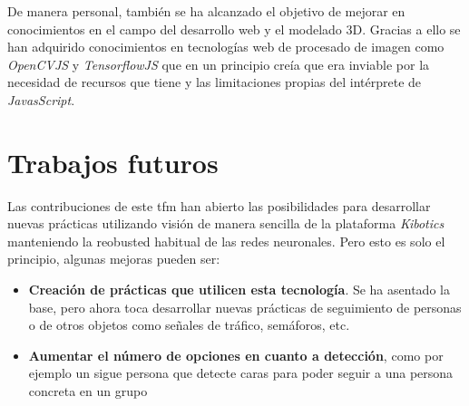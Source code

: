 De manera personal, también se ha alcanzado el objetivo de mejorar en conocimientos en el campo del desarrollo web y el modelado 3D. Gracias a ello se han adquirido conocimientos en tecnologías web de procesado de imagen como \textit{OpenCVJS} y \textit{TensorflowJS }que en un principio creía que era inviable por la necesidad de recursos que tiene y las limitaciones propias del intérprete de \textit{JavasScript}.
\section{Trabajos futuros}
Las contribuciones de este \acrshort{tfm} han abierto las posibilidades para desarrollar nuevas prácticas utilizando visión de manera sencilla de la plataforma \textit{Kibotics} manteniendo la reobusted habitual de las redes neuronales. Pero esto es solo el principio, algunas mejoras pueden ser:

\begin{itemize}
  \item \textbf{Creación de prácticas que utilicen esta tecnología}. Se ha asentado la base, pero ahora toca desarrollar nuevas prácticas de seguimiento de personas o de otros objetos como señales de tráfico, semáforos, etc.
  \item \textbf{Aumentar el número de opciones en cuanto a detección}, como por ejemplo un sigue persona que detecte caras para poder seguir a una persona concreta en un grupo
\end{itemize}

